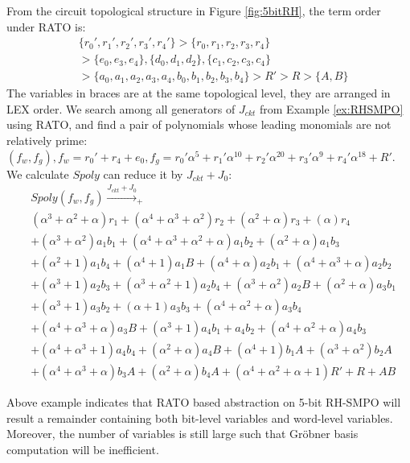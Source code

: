 \begin{Example}
\label{ex:newRATO}
From the circuit topological structure in Figure \ref{fig:5bitRH}, the term order under RATO is:
\begin{align}
&\{r_0',r_1',r_2',r_3',r_4'\}>\{r_0,r_1,r_2,r_3,r_4\}\nonumber\\
&>\{e_0,e_3,e_4\},\{d_0,d_1,d_2\},\{c_1,c_2,c_3,c_4\}\nonumber\\
&>\{a_0,a_1,a_2,a_3,a_4,b_0,b_1,b_2,b_3,b_4\}>R'>R>\{A,B\}\nonumber
\end{align}
The variables in braces are at the same topological level, they are arranged in LEX order. 
We search among all generators of $J_{ckt}$ from Example \ref{ex:RHSMPO} using RATO, 
and find a pair of polynomials whose leading 
monomials are not relatively prime:
$(f_w,f_g), f_w = r_0'+r_4+e_0, f_g =r_0'\alpha^5+r_1'\alpha^{10}+r_2'\alpha^{20}+r_3'\alpha^9+r_4'\alpha^{18} + R'$.
We calculate $Spoly$ can reduce it by $J_{ckt}+J_0$:
\begin{align}
&Spoly(f_w,f_g) \xrightarrow{J_{ckt}+J_0}_{+}\nonumber\\
&(\alpha^3+\alpha^2+\alpha) r_1+(\alpha^4+\alpha^3+\alpha^2) r_2+(\alpha^2+\alpha) r_3+(\alpha) r_4\nonumber\\
&+(\alpha^3+\alpha^2) a_1 b_1+(\alpha^4+\alpha^3+\alpha^2+\alpha) a_1 b_2+(\alpha^2+\alpha) a_1 b_3\nonumber\\
&+(\alpha^2+1) a_1 b_4+(\alpha^4+1) a_1 B+(\alpha^4+\alpha) a_2 b_1+(\alpha^4+\alpha^3+\alpha) a_2 b_2\nonumber\\
&+(\alpha^3+1) a_2 b_3+(\alpha^3+\alpha^2+1) a_2 b_4+(\alpha^3+\alpha^2) a_2 B+(\alpha^2+\alpha) a_3 b_1\nonumber\\
&+(\alpha^3+1) a_3 b_2+(\alpha+1) a_3 b_3+(\alpha^4+\alpha^2+\alpha) a_3 b_4\nonumber\\
&+(\alpha^4+\alpha^3+\alpha) a_3 B+(\alpha^3+1) a_4 b_1+a_4 b_2+(\alpha^4+\alpha^2+\alpha) a_4 b_3\nonumber\\
&+(\alpha^4+\alpha^3+1) a_4 b_4+(\alpha^2+\alpha) a_4 B+(\alpha^4+1) b_1 A+(\alpha^3+\alpha^2) b_2 A\nonumber\\
&+(\alpha^4+\alpha^3+\alpha) b_3 A+(\alpha^2+\alpha) b_4 A+(\alpha^4+\alpha^2+\alpha+1) R'+R+A B\nonumber
\end{align}
\end{Example}
Above example indicates that RATO based abstraction on 5-bit RH-SMPO will result a remainder containing both
bit-level variables and word-level variables. Moreover, the number of variables is still large such that
Gr\"obner basis computation will be inefficient.

